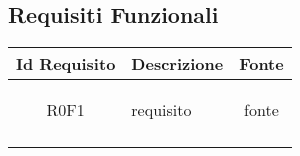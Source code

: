 \subsection{Requisiti Funzionali}
\normalsize
\begin{longtable}{|c|>{\centering}m{7cm}|c|}
\hline
\textbf{Id Requisito} & \textbf{Descrizione} & \textbf{Fonte}\\
\hline
\endhead
\hypertarget{R0F1}{R0F1} & requisito & fonte \\ \hline 
\caption[Requisiti Funzionali]{Requisiti Funzionali
\label{tabella:req0}
\end{longtable}
\clearpage
